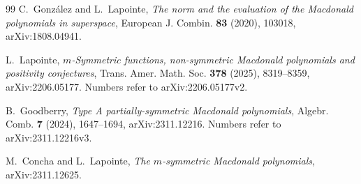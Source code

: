 \documentclass[11pt]{amsart}
\theoremstyle{definition}
\theoremstyle{remark}
\begin{document}
{\begin{thebibliography}{99}
C.~Gonz\'alez and L.~Lapointe,
\emph{The norm and the evaluation of the Macdonald polynomials in superspace},
European J. Combin. \textbf{83} (2020), 103018,
arXiv:1808.04941.

L.~Lapointe,
\emph{\(m\)-Symmetric functions, non-symmetric Macdonald polynomials and positivity conjectures},
Trans. Amer. Math. Soc. \textbf{378} (2025), 8319--8359,
arXiv:2206.05177. Numbers refer to arXiv:2206.05177v2.

B.~Goodberry,
\emph{Type A partially-symmetric Macdonald polynomials},
Algebr. Comb. \textbf{7} (2024), 1647--1694,
arXiv:2311.12216. Numbers refer to arXiv:2311.12216v3.

M.~Concha and L.~Lapointe,
\emph{The \(m\)-symmetric Macdonald polynomials},
arXiv:2311.12625.

\end{thebibliography}
}
\end{document}

